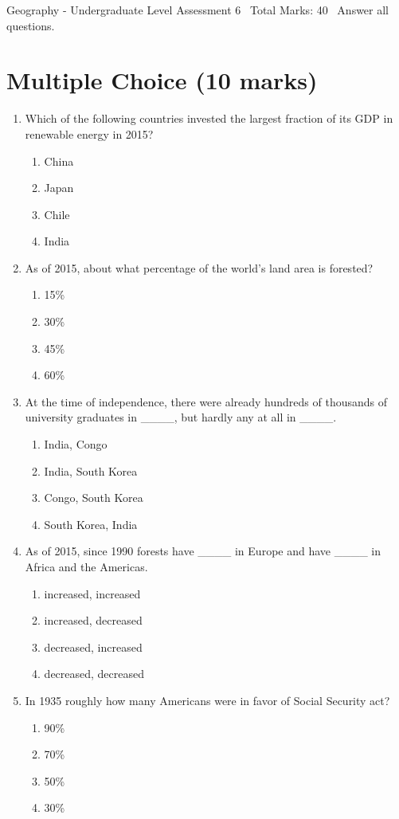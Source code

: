 \documentclass[12pt]{article}
\begin{document}
\begin{center}
Geography - Undergraduate Level Assessment 6 \
Total Marks: 40 \
Answer all questions.
\end{center}

\section*{Multiple Choice (10 marks)}
\begin{enumerate}[label=\arabic*.]
\item Which of the following countries invested the largest fraction of its GDP in renewable energy in 2015?
\begin{enumerate}[label=(\alph*)]
    \item China
    \item Japan
    \item Chile
    \item India
\end{enumerate}
\item As of 2015, about what percentage of the world's land area is forested?
\begin{enumerate}[label=(\alph*)]
    \item 15\%
    \item 30\%
    \item 45\%
    \item 60\%
\end{enumerate}
\item At the time of independence, there were already hundreds of thousands of university graduates in \_\_\_\_, but hardly any at all in \_\_\_\_.
\begin{enumerate}[label=(\alph*)]
    \item India, Congo
    \item India, South Korea
    \item Congo, South Korea
    \item South Korea, India
\end{enumerate}
\item As of 2015, since 1990 forests have \_\_\_\_ in Europe and have \_\_\_\_ in Africa and the Americas.
\begin{enumerate}[label=(\alph*)]
    \item increased, increased
    \item increased, decreased
    \item decreased, increased
    \item decreased, decreased
\end{enumerate}
\item In 1935 roughly how many Americans were in favor of Social Security act?
\begin{enumerate}[label=(\alph*)]
    \item 90\%
    \item 70\%
    \item 50\%
    \item 30\%
\end{enumerate}
\end{enumerate}
\end{document}
